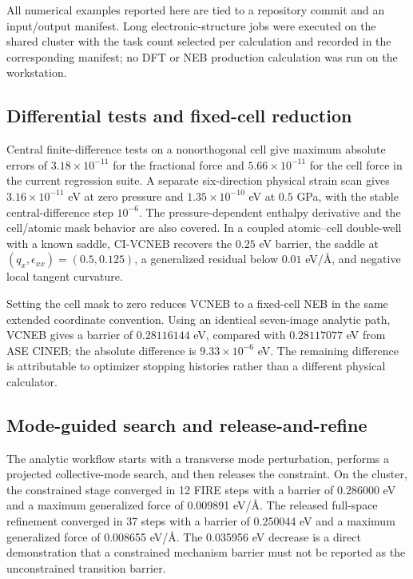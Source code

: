 \documentclass[final,3p,times]{elsarticle}
\begin{document}
All numerical examples reported here are tied to a repository commit and an
input/output manifest.  Long electronic-structure jobs were executed on the
shared cluster with the task count selected per calculation and recorded in
the corresponding manifest; no DFT or NEB production calculation was run on
the workstation.

\subsection{Differential tests and fixed-cell reduction}

Central finite-difference tests on a nonorthogonal cell give maximum absolute
errors of $3.18\times10^{-11}$ for the fractional force and
$5.66\times10^{-11}$ for the cell force in the current regression suite.  A
separate six-direction physical strain scan gives $3.16\times10^{-11}$ eV at
zero pressure and $1.35\times10^{-10}$ eV at $0.5$ GPa, with the stable
central-difference step $10^{-6}$.  The pressure-dependent enthalpy derivative
and the cell/atomic mask behavior are also covered.  In a coupled atomic--cell double-well with a known saddle,
CI-VCNEB recovers the $0.25$ eV barrier, the saddle at
$(q_x,\epsilon_{xx})=(0.5,0.125)$, a generalized residual below $0.01$ eV/Å,
and negative local tangent curvature.

Setting the cell mask to zero reduces VCNEB to a fixed-cell NEB in the same
extended coordinate convention.  Using an identical seven-image analytic
path, VCNEB gives a barrier of $0.28116144$ eV, compared with $0.28117077$ eV
from ASE CINEB; the absolute difference is $9.33\times10^{-6}$ eV.  The
remaining difference is attributable to optimizer stopping histories rather
than a different physical calculator.

\subsection{Mode-guided search and release-and-refine}

The analytic workflow starts with a transverse mode perturbation, performs a
projected collective-mode search, and then releases the constraint.  On the
cluster, the constrained stage converged in 12 FIRE steps with a barrier of
0.286000 eV and a maximum generalized force of 0.009891 eV/Å.  The released
full-space refinement converged in 37 steps with a barrier of 0.250044 eV and
a maximum generalized force of 0.008655 eV/Å.  The 0.035956 eV decrease is a
direct demonstration that a constrained mechanism barrier must not be
reported as the unconstrained transition barrier.
\end{document}
